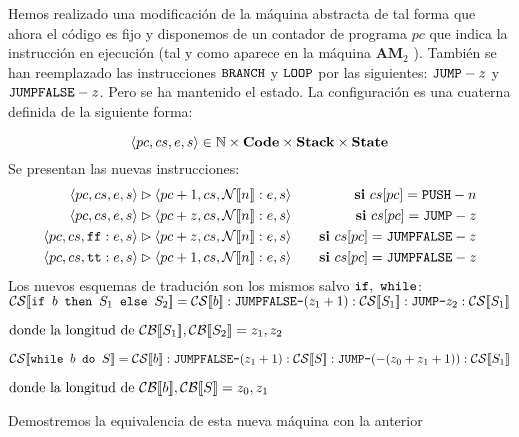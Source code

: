 \begin{example}
    Hemos realizado una modificación de la máquina abstracta de tal forma que ahora el código es fijo y disponemos de un contador de programa $pc$ que indica la instrucción en ejecución (tal y como aparece en la máquina $\mathbf{A M}_{2}$ ). También se han reemplazado las instrucciones $\texttt{BRANCH}$ y $\texttt{LOOP}$ por las siguientes: $\texttt{JUMP}-z$
y $\texttt{JUMPFALSE}-z$. Pero se ha mantenido el estado. La configuración es una cuaterna definida de la siguiente forma:

$$ \langle pc, cs , e, s \rangle \in \mathbb{N} \times \mathbf{Code} \times \mathbf{Stack} \times \mathbf{State} $$
Se presentan las nuevas instrucciones:
\begin{eqnarray*}
    \lac{pc}{cs}{e}{s} \rhd \lac{pc+1}{cs}{\fc{N}{n}:e}{s} &\quad& \mathbf{si} \ cs[pc] = \n{PUSH}-n \\
    \lac{pc}{cs}{e}{s} \rhd \lac{pc+z}{cs}{\fc{N}{n}:e}{s} &\quad& \mathbf{si} \ cs[pc] = \n{JUMP}-z \\
    \lac{pc}{cs}{\n{ff}: e}{s} \rhd \lac{pc+z}{cs}{\fc{N}{n}:e}{s} &\quad& \mathbf{si} \ cs[pc] = \n{JUMPFALSE}-z \\
    \lac{pc}{cs}{\n{tt}: e}{s} \rhd \lac{pc+1}{cs}{\fc{N}{n}:e}{s} &\quad& \mathbf{si} \ cs[pc] = \n{JUMPFALSE}-z
\end{eqnarray*}
Los nuevos esquemas de tradución son los mismos salvo $\texttt{if},\  \texttt{while}$:
$ \fc{CS}{\n{if }b\n{ then } S_1 \n{ else }S_2} = \fc{CS}{b}: \n{JUMPFALSE-}(z_1 +1) : \fc{CS}{S_1}:\n{JUMP-}z_2 : \fc{CS}{S_1} $
\begin{center}
    $\text{donde la longitud de }\mathcal{CB}[\![S_1]\!], \mathcal{CB}[\![S_2]\!] = z_1, z_2$
\end{center}
$ \fc{CS}{\n{while }b\n{ do }S} = \fc{CS}{b}: \n{JUMPFALSE-}(z_1 +1) : \fc{CS}{S}:\n{JUMP-}(-(z_0+z_1+1)) : \fc{CS}{S_1} $
\begin{center}
    $\text{donde la longitud de }\mathcal{CB}[\![b]\!], \mathcal{CB}[\![S]\!] = z_0, z_1$
\end{center}
Demostremos la equivalencia de esta nueva máquina con la anterior
\end{example}